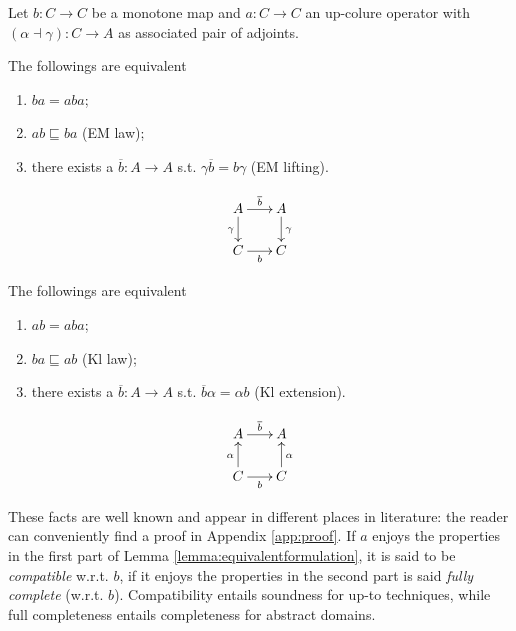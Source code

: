 \documentclass{llncs}
\begin{document}
\begin{lemma}\label{lemma:equivalentformulation}
Let $b\colon C\to C$ be a monotone map and $a\colon C\to C$ an up-colure operator with $(\alpha \dashv \gamma)\colon C \to A$ as associated pair of adjoints. 

\noindent The followings are equivalent

\begin{minipage}{0.7\textwidth}
\begin{enumerate}
\item $ba = aba$;
\item $ab \sqsubseteq ba$ (EM law);
\item there exists a  $\overline{b}\colon A \to A$ s.t.  $\gamma \overline{b} =  b \gamma$ (EM lifting).
\end{enumerate}\end{minipage}
\begin{minipage}{0.3\textwidth}
$$\xymatrix@R=0.2cm@C=0.2cm{
A \ar[rr]^{\overline{b}} \ar[dd]_\gamma & & A  \ar[dd]^\gamma \\ 
&  \\
C \ar[rr]_b & &  C 
}$$
\end{minipage}


\noindent The followings are equivalent

\begin{minipage}{0.7\textwidth}
\begin{enumerate}
\item $ab = aba$;
\item $ba \sqsubseteq ab$ (Kl law);
\item there exists a $\overline{b}\colon A \to A$ s.t. $\overline{b} \alpha = \alpha b$ (Kl extension).
\end{enumerate}\end{minipage}
\begin{minipage}{0.3\textwidth}
$$\xymatrix@R=0.2cm@C=0.2cm{A \ar[rr]^{\overline{b}} & & A\\ 
&  \\
C \ar[rr]_b \ar[uu]^\alpha & &  C \ar[uu]_\alpha
}$$
\end{minipage}
\end{lemma}
These facts are well known and appear in different places in literature: the reader can conveniently find a proof in Appendix \ref{app:proof}. If $a$ enjoys the properties in the first part of Lemma \ref{lemma:equivalentformulation}, it is said to be \emph{compatible} w.r.t. $b$, if it enjoys the properties in the second part is said \emph{fully complete} (w.r.t. $b$). Compatibility entails soundness for up-to techniques, while full completeness entails completeness for abstract domains.
\end{document}
